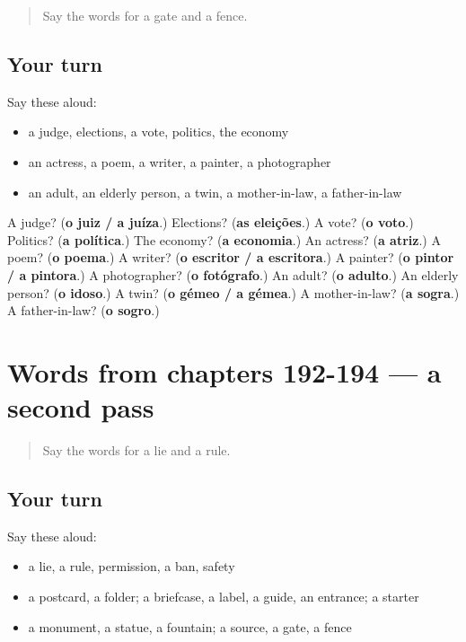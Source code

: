 \begin{quote}
Say the words for a gate and a fence.
\end{quote}

\subsection*{Your turn}
Say these aloud:

\begin{itemize}
\raggedright
  \item a judge, elections, a vote, politics, the economy
  \item an actress, a poem, a writer, a painter, a photographer
  \item an adult, an elderly person, a twin, a mother-in-law, a father-in-law
\end{itemize}

\begin{tcolorbox}[breakable,colback=teal!4,colframe=teal!35!black,title={Before you move on}]
A judge? (\textbf{o juiz / a juíza}.) Elections? (\textbf{as eleições}.) A vote? (\textbf{o voto}.) Politics? (\textbf{a política}.) The economy? (\textbf{a economia}.) An actress? (\textbf{a atriz}.) A poem? (\textbf{o poema}.) A writer? (\textbf{o escritor / a escritora}.) A painter? (\textbf{o pintor / a pintora}.) A photographer? (\textbf{o fotógrafo}.) An adult? (\textbf{o adulto}.) An elderly person? (\textbf{o idoso}.) A twin? (\textbf{o gémeo / a gémea}.) A mother-in-law? (\textbf{a sogra}.) A father-in-law? (\textbf{o sogro}.)
\end{tcolorbox}
\section[(dialogue)]{Words from chapters 192-194 — a second pass}

\label{lesson:PT-R194-second-pass-words-from-chapters-192-194}



\begin{quote}
Say the words for a lie and a rule.
\end{quote}

\subsection*{Your turn}
Say these aloud:

\begin{itemize}
\raggedright
  \item a lie, a rule, permission, a ban, safety
  \item a postcard, a folder; a briefcase, a label, a guide, an entrance; a starter
  \item a monument, a statue, a fountain; a source, a gate, a fence
\end{itemize}


